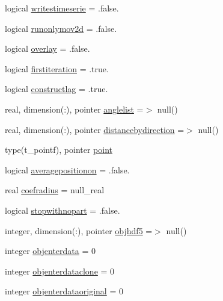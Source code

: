 \begin{DoxyCompactItemize}
logical \mbox{\hyperlink{structmodulelagrangianglobal_1_1t__lagrangian_a5c0a7c65e860d3c5c9751d8f2f6ca581}{writestimeserie}} = .false.
\item 
logical \mbox{\hyperlink{structmodulelagrangianglobal_1_1t__lagrangian_ae88ded50cff49a36c73fb8b1939b459b}{runonlymov2d}} = .false.
\item 
logical \mbox{\hyperlink{structmodulelagrangianglobal_1_1t__lagrangian_af7f2b89d9ae0dcee012ce3662164a998}{overlay}} = .false.
\item 
logical \mbox{\hyperlink{structmodulelagrangianglobal_1_1t__lagrangian_a0eec538140511266ab9065d175a93423}{firstiteration}} = .true.
\item 
logical \mbox{\hyperlink{structmodulelagrangianglobal_1_1t__lagrangian_a8f80f03bb8c3c8ceb07941997c9b37be}{constructlag}} = .true.
\item 
real, dimension(\+:), pointer \mbox{\hyperlink{structmodulelagrangianglobal_1_1t__lagrangian_ad3e57b92dad44c2c703f394fb2577e1a}{anglelist}} =$>$ null()
\item 
real, dimension(\+:), pointer \mbox{\hyperlink{structmodulelagrangianglobal_1_1t__lagrangian_a56e5bbbdd951786ddf629f433019b723}{distancebydirection}} =$>$ null()
\item 
type(t\+\_\+pointf), pointer \mbox{\hyperlink{structmodulelagrangianglobal_1_1t__lagrangian_a1cc49c8dafa073359444a38ea7930703}{point}}
\item 
logical \mbox{\hyperlink{structmodulelagrangianglobal_1_1t__lagrangian_ab1bc79c1222156ee71606d6e48f837c5}{averagepositionon}} = .false.
\item 
real \mbox{\hyperlink{structmodulelagrangianglobal_1_1t__lagrangian_ab1266e5c3fa5fe95ee8d9a747b640b85}{coefradius}} = null\+\_\+real
\item 
logical \mbox{\hyperlink{structmodulelagrangianglobal_1_1t__lagrangian_a5161b3dcc6f74b95d9d945cb1d9e923c}{stopwithnopart}} = .false.
\item 
integer, dimension(\+:), pointer \mbox{\hyperlink{structmodulelagrangianglobal_1_1t__lagrangian_a9f2ce171829890c90bcf6401d60686c7}{objhdf5}} =$>$ null()
\item 
integer \mbox{\hyperlink{structmodulelagrangianglobal_1_1t__lagrangian_a54167b14e694dab8295a55c33d8202fd}{objenterdata}} = 0
\item 
integer \mbox{\hyperlink{structmodulelagrangianglobal_1_1t__lagrangian_a86b98727a37f6ac3a62cd540e06b3c20}{objenterdataclone}} = 0
\item 
integer \mbox{\hyperlink{structmodulelagrangianglobal_1_1t__lagrangian_a21c343c7608dba34e25586cba83ac68e}{objenterdataoriginal}} = 0

\end{DoxyCompactItemize}
